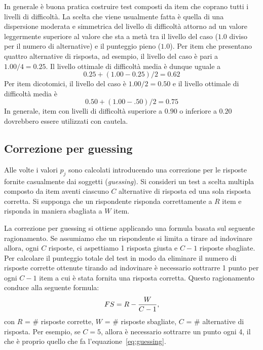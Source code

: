    In generale è buona pratica costruire test composti da item
    che coprano tutti i livelli di difficoltà.  
La scelta che viene usualmente fatta è quella di una
    dispersione moderata e simmetrica del livello di difficoltà
    attorno ad un valore leggermente superiore al valore che sta a
    metà tra il livello del caso ($1.0$ diviso per il numero di
    alternative) e il punteggio pieno ($1.0$). 
Per item che presentano quattro alternative di risposta, ad
    esempio, il livello del caso è pari a $1.00/4 = 0.25$.  Il livello 
    ottimale di difficoltà media è dunque uguale a  $$0.25 +
    (1.00 - 0.25) / 2 = 0.62$$
   Per item dicotomici, il livello
    del caso è $1.00/2 = 0.50$ e il livello ottimale di difficoltà
    media è $$0.50+(1.00-.50)/2 = 0.75$$ 
   In generale, item con livelli di difficoltà superiore a $0.90$
    o inferiore a $0.20$ dovrebbero essere utilizzati con cautela. 


\subsection{Correzione per guessing}

Alle volte i valori $p_j$ sono calcolati introducendo una correzione
per le risposte fornite casualmente dai soggetti (\emph{guessing}). 
Si consideri un test a scelta multipla composto da  item aventi
ciascuno $C$ alternative di risposta ed una sola risposta corretta. 
Si supponga che un rispondente risponda correttamente a $R$ item e
risponda in maniera sbagliata a $W$ item.  

 La correzione per guessing si ottiene applicando una formula
  basata sul seguente ragionamento.  
  Se assumiamo che un rispondente si limita a tirare ad indovinare
allora, ogni $C$ risposte, ci aspettiamo 1 risposta giusta e $C-1$
risposte sbagliate.  
 Per calcolare il punteggio totale del test in modo da eliminare il 
numero di risposte corrette ottenute tirando ad indovinare è
necessario sottrarre 1 punto per ogni $C-1$ item a cui è stata fornita
una risposta corretta. 
 Questo ragionamento conduce alla seguente formula:
\begin{equation}
FS = R - \frac{W}{C - 1},\notag
\label{eq:guessing}
\end{equation}
con  $R$ = \# risposte corrette, 
 $W$ = \# risposte sbagliate, 
$C$ = \# alternative di risposta.
Per esempio, se $C=5$, allora è necessario sottrarre un punto ogni 4, il che è proprio quello che fa l'equazione~\ref{eq:guessing}. 

